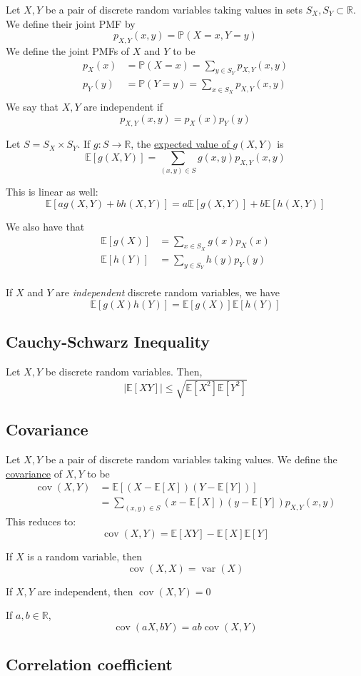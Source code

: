 \documentclass[
]{article}
\theoremstyle{definition}
\theoremstyle{definition}
\theoremstyle{definition}
\theoremstyle{remark}
\newcommand{\prob}[1]{\mathbb{P}\left(#1\right)}
\newcommand{\pxx}{p_X(x)}
\newcommand{\pyy}{p_Y(y)}
\newcommand{\pxyxy}{p_{X,Y}(x,y)}
\newcommand{\pxy}[1]{p_{X,Y}(#1)}
\newcommand{\R}{\mathbb{R}}
\newcommand{\E}[1]{\mathbb{E}[#1]}
\newcommand{\covxy}{\operatorname{cov}(X,Y)}
\newcommand{\cov}[1]{\operatorname{cov}\left(#1\right)}
\newcommand{\varx}{\operatorname{var}(X)}
\newcommand{\sst}{\subset}
\begin{document}
Let $X,Y$ be a pair of discrete random variables taking values in sets $S_X,S_Y\sst\R$. We define their joint PMF by
\[\pxy{x,y}=\prob{X=x,Y=y}\]
We define the joint PMFs of $X$ and $Y$ to be
\begin{align*}
  \pxx & =\prob{X=x}=\sum_{y\in S_Y} \pxyxy \\
  \pyy & =\prob{Y=y}=\sum_{x\in S_X} \pxyxy \\
\end{align*}
We say that $X,Y$ are independent if
\[\pxyxy=\pxx\pyy\]

Let $S=S_X\times S_Y$. If $g:S\to\R$, the \underline{expected value of $g(X,Y)$} is
\[\E{g(X,Y)}=\sum_{(x,y)\in S}g(x,y)\pxyxy\]

This is linear as well:
\[\E{ag(X,Y)+bh(X,Y)}=a\E{g(X,Y)}+b\E{h(X,Y)}\]

We also have that
\begin{align*}
  \E{g(X)} & =\sum_{x\in S_X}g(x)\pxx \\
  \E{h(Y)} & =\sum_{y\in S_Y}h(y)\pyy \\
\end{align*}

If $X$ and $Y$ are \textit{independent} discrete random variables, we have
\[\E{g(X)h(Y)}=\E{g(X)}\E{h(Y)}\]

\subsection{Cauchy-Schwarz Inequality}
Let $X,Y$ be discrete random variables. Then,
\[|\E{XY}|\leq\sqrt{\E{X^2}\E{Y^2}}\]

\subsection{Covariance}
Let $X,Y$ be a pair of discrete random variables taking values. We define the \underline{covariance} of $X,Y$ to be
\begin{align*}
  \covxy & =\E{(X-\E{X})(Y-\E{Y})}                     \\
         & =\sum_{(x,y)\in S} (x-\E{X})(y-\E{Y})\pxyxy
\end{align*}
This reduces to:
\[\covxy=\E{XY}-\E{X}\E{Y}\]

If $X$ is a random variable, then
\[\cov{X,X}=\varx\]

If $X,Y$ are independent, then $\covxy=0$

If $a,b\in\R$,
\[\cov{aX,bY}=ab\covxy\]

\subsection{Correlation coefficient}
\end{document}
